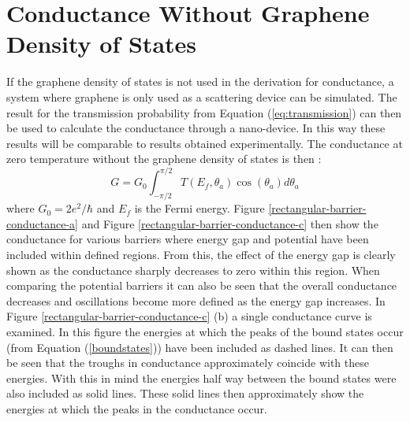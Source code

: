 		\section{Conductance Without Graphene Density of States}
		\label{Rectangular Barrier - Conductance Withount Graphene Density of States}
			If the graphene density of states is not used in the derivation for conductance, a system where graphene is only used as a scattering device can be simulated. The result for the transmission probability from Equation (\ref{eq:transmission}) can then be used to calculate the conductance through a nano-device. In this way these results will be comparable to results obtained experimentally. The conductance at zero temperature without the graphene density of states is then \cite{b4, b13, b16}:
			\begin{equation}
				G=G_{0}\int^{\pi/2}_{-\pi/2}T\left(E_{f},\theta_{a}\right)\cos(\theta_{a})d\theta_{a}
				\label{g}
			\end{equation}
			where $G_{0}=2e^{2}/\hbar$ and $E_{f}$ is the Fermi energy. Figure \ref{rectangular-barrier-conductance-a} and Figure \ref{rectangular-barrier-conductance-c} then show the conductance for various barriers where energy gap and potential have been included within defined regions. From this, the effect of the energy gap is clearly shown as the conductance sharply decreases to zero within this region. When comparing the potential barriers it can also be seen that the overall conductance decreases and oscillations become more defined as the energy gap increases. In Figure \ref{rectangular-barrier-conductance-c} (b) a single conductance curve is examined. In this figure the energies at which the peaks of the bound states occur (from Equation (\ref{boundstates})) have been included as dashed lines. It can then be seen that the troughs in conductance approximately coincide with these energies. With this in mind the energies half way between the bound states were also included as solid lines. These solid lines then approximately show the energies at which the peaks in the conductance occur.
